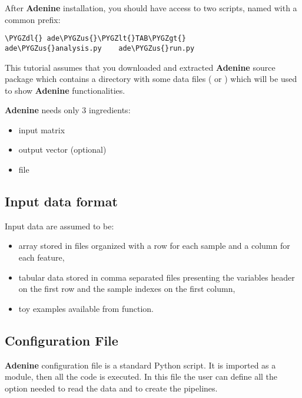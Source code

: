 \documentclass[letterpaper,10pt,english]{sphinxmanual}
\def\PYGZus{\char`\_}
\def\PYGZlt{\char`\<}
\def\PYGZgt{\char`\>}
\def\PYGZdl{\char`\$}
\begin{document}
After \textbf{Adenine} installation, you should have access to two scripts,
named with a common  prefix:

\begin{Verbatim}[commandchars=\\\{\}]
\PYGZdl{} ade\PYGZus{}\PYGZlt{}TAB\PYGZgt{}
ade\PYGZus{}analysis.py    ade\PYGZus{}run.py
\end{Verbatim}

This tutorial assumes that you downloaded and extracted \textbf{Adenine}
source package which contains a  directory with some data files ( or ) which will be used to show \textbf{Adenine} functionalities.

\textbf{Adenine} needs only 3 ingredients:
\begin{itemize}
\item {} 
 input matrix

\item {} 
 output vector (optional)

\item {} 
 file

\end{itemize}


\subsection{Input data format}
\label{tutorial:input-data-format}
Input data are assumed to be:
\begin{itemize}
\item {} 
 array stored in  files organized with a row for each sample and a column for each feature,

\item {} 
tabular data stored in comma separated  files presenting the variables header on the first row and the sample indexes on the first column,

\item {} 
toy examples available from  function.

\end{itemize}


\subsection{Configuration File}
\label{tutorial:configuration-file}\label{tutorial:configuration}
\textbf{Adenine} configuration file is a standard Python script. It is
imported as a module, then all the code is executed. In this file the user can define all the option needed to read the data and to create the pipelines.
\end{document}
